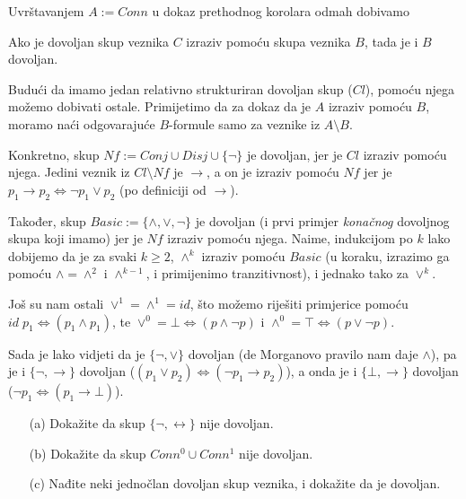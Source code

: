 Uvrštavanjem $A:=Conn$ u dokaz prethodnog korolara odmah dobivamo

\begin{korolar}
	Ako je dovoljan skup veznika $C$ izraziv pomoću skupa veznika $B$, tada je i $B$ dovoljan.
\end{korolar}

Budući da imamo jedan relativno strukturiran dovoljan skup ($Cl$), po\-mo\-ću njega možemo dobivati ostale. Primijetimo da za dokaz da je $A$ izraziv pomoću $B$, moramo naći odgovarajuće $B$-formule samo za veznike iz $A\setminus B$. 

Konkretno, skup
$Nf:=Conj\cup Disj\cup\{\neg\}$ je dovoljan, jer je $Cl$ izraziv pomoću njega. Jedini veznik iz $Cl\setminus Nf$ je $\to$, a on je izraziv pomoću $Nf$ jer je
$p_1\to p_2\Leftrightarrow\neg p_1\vee p_2$ (po definiciji od $\to$).

Također, skup
$Basic:=\{\wedge, \vee, \neg\}$ je dovoljan (i prvi primjer \emph{konačnog} dovoljnog skupa koji imamo) jer je $Nf$ izraziv pomoću njega. Naime, indukcijom po $k$ lako dobijemo da je za svaki $k\ge 2$, $\wedge^k$ izraziv pomoću $Basic$ (u koraku, izrazimo ga pomoću $\wedge=\wedge^2$ i $\wedge^{k-1}$, i primijenimo tranzitivnost), i jednako tako za $\vee^k$.

Još su nam ostali $\vee^1=\wedge^1=id$, što možemo riješiti primjerice pomoću $id\; p_1\Leftrightarrow(p_1\wedge p_1)$, te $\vee^0=\bot\Leftrightarrow (p\wedge\neg p)$ i $\wedge^0=\top\Leftrightarrow(p\vee\neg p)$.

Sada je lako vidjeti da je
$\{\neg,\vee\}$ dovoljan (de Morganovo pravilo nam daje $\wedge$), pa je i $\{\neg, \to\}$ dovoljan ($(p_1\vee p_2)\Leftrightarrow(\neg p_1\to p_2)$), a onda je i $\{\bot,\to\}$ dovoljan ($\neg p_1\Leftrightarrow(p_1\to\bot)$).

\begin{zadatak}\begin{enumerate}
	\item[(a)] Dokažite da skup $\{\neg,\leftrightarrow\}$ nije dovoljan.
	\item[(b)] Dokažite da skup $Conn^0\cup Conn^1$ nije dovoljan.
	\item[(c)] Nađite neki jednočlan dovoljan skup veznika, i dokažite da je dovoljan.
\end{enumerate}
\end{zadatak}